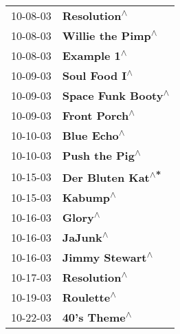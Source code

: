 \begin{supertabular}{p{0.25\columnwidth}p{0.75\columnwidth}}
 10-08-03 &                                                               \textbf{Resolution\textsuperscript{$\wedge$}} \\
 10-08-03 &                                                          \textbf{Willie the Pimp\textsuperscript{$\wedge$}} \\
 10-08-03 &                                                                \textbf{Example 1\textsuperscript{$\wedge$}} \\
 10-09-03 &                                                              \textbf{Soul Food I\textsuperscript{$\wedge$}} \\
 10-09-03 &                                                         \textbf{Space Funk Booty\textsuperscript{$\wedge$}} \\
 10-09-03 &                                                              \textbf{Front Porch\textsuperscript{$\wedge$}} \\
 10-10-03 &                                                                \textbf{Blue Echo\textsuperscript{$\wedge$}} \\
 10-10-03 &                                                             \textbf{Push the Pig\textsuperscript{$\wedge$}} \\
 10-15-03 &                                                          \textbf{Der Bluten Kat\textsuperscript{$\wedge$*}} \\
 10-15-03 &                                                                   \textbf{Kabump\textsuperscript{$\wedge$}} \\
 10-16-03 &                                                                    \textbf{Glory\textsuperscript{$\wedge$}} \\
 10-16-03 &                                                                   \textbf{JaJunk\textsuperscript{$\wedge$}} \\
 10-16-03 &                                                            \textbf{Jimmy Stewart\textsuperscript{$\wedge$}} \\
 10-17-03 &                                                               \textbf{Resolution\textsuperscript{$\wedge$}} \\
 10-19-03 &                                                                 \textbf{Roulette\textsuperscript{$\wedge$}} \\
 10-22-03 &                                                               \textbf{40's Theme\textsuperscript{$\wedge$}} \\

\end{supertabular}
